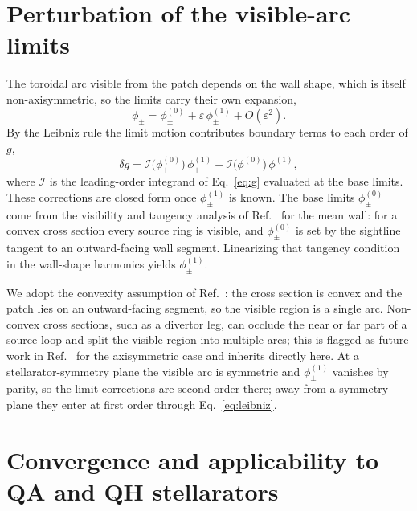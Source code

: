 \documentclass[11pt]{article}
\newcommand{\eps}{\varepsilon}
\newcommand{\Order}[1]{O(\eps^{#1})}
\begin{document}
\section{Perturbation of the visible-arc limits}
\label{sec:bounds}

The toroidal arc visible from the patch depends on the wall shape, which is itself non-axisymmetric, so the limits carry their own expansion,
\begin{equation}
\phi_\pm=\phi_\pm^{(0)}+\eps\,\phi_\pm^{(1)}+\Order{2}.
\label{eq:limitexpand}
\end{equation}
By the Leibniz rule the limit motion contributes boundary terms to each order of $g$,
\begin{equation}
\delta g=\mathcal{I}\big(\phi_+^{(0)}\big)\,\phi_+^{(1)}-\mathcal{I}\big(\phi_-^{(0)}\big)\,\phi_-^{(1)},
\label{eq:leibniz}
\end{equation}
where $\mathcal{I}$ is the leading-order integrand of Eq.~\eqref{eq:g} evaluated at the base limits. These corrections are closed form once $\phi_\pm^{(1)}$ is known. The base limits $\phi_\pm^{(0)}$ come from the visibility and tangency analysis of Ref.~\cite{schwartz2025} for the mean wall: for a convex cross section every source ring is visible, and $\phi_\pm^{(0)}$ is set by the sightline tangent to an outward-facing wall segment. Linearizing that tangency condition in the wall-shape harmonics yields $\phi_\pm^{(1)}$.

We adopt the convexity assumption of Ref.~\cite{schwartz2025}: the cross section is convex and the patch lies on an outward-facing segment, so the visible region is a single arc. Non-convex cross sections, such as a divertor leg, can occlude the near or far part of a source loop and split the visible region into multiple arcs; this is flagged as future work in Ref.~\cite{schwartz2025} for the axisymmetric case and inherits directly here. At a stellarator-symmetry plane the visible arc is symmetric and $\phi_\pm^{(1)}$ vanishes by parity, so the limit corrections are second order there; away from a symmetry plane they enter at first order through Eq.~\eqref{eq:leibniz}.

\section{Convergence and applicability to QA and QH stellarators}
\label{sec:convergence}
\end{document}
